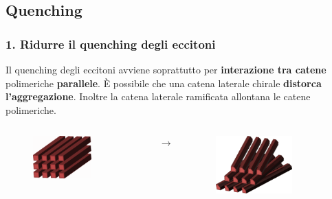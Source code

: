 \documentclass{beamer}
\begin{document}
\subsection{Quenching}
\begin{frame}%
\frametitle{1. Ridurre il quenching degli eccitoni}
Il quenching degli eccitoni avviene soprattutto per \textbf{interazione tra catene} polimeriche \textbf{parallele}.
\vfill \pause
È possibile che una catena laterale chirale \textbf{distorca l'aggregazione}. Inoltre la catena laterale ramificata allontana le catene polimeriche.
\vfill 
\begin{columns}
\begin{figure}\centering \includegraphics[width=0.7\textwidth]{img/parallele.png}\end{figure}
\centering $\longrightarrow$
\begin{figure}\centering \includegraphics[width=0.7\textwidth]{img/nonparallele.png}\end{figure}
\end{columns}
\end{frame}
\end{document}
